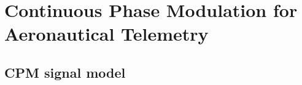 
\chapter{Continuous Phase Modulation for Aeronautical Telemetry }
\label{chapter:1}
\minitoc
\newpage
\graphicspath{{2-Chapters/1-Chapter/Images/}}
\section{CPM signal model}
\label{sec:CPM_signal_model}
